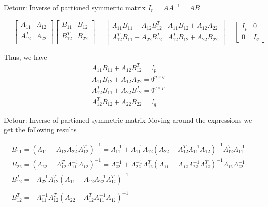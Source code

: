 \documentclass{beamer}
\begin{document}
\begin{frame}{Detour: Inverse of partioned symmetric matrix}
$I_n = AA^{-1} = AB$

$=\begin{bmatrix}
A_{11} & A_{12}\\
A_{12}^T & A_{22} \\
\end{bmatrix} \begin{bmatrix}
B_{11} & B_{12}\\
B_{12}^T & B_{22} \\
\end{bmatrix}
= \begin{bmatrix}
A_{11}B_{11} +A_{12}B_{12}^T & A_{11}B_{12} + A_{12}A_{22}\\
A_{12}^TB_{11} + A_{22}B_{12}^T & A_{12}^TB_{12} + A_{22}B_{22}  \\
\end{bmatrix} = \begin{bmatrix}
I_p & 0 \\
0 & I_q
\end{bmatrix}$

Thus, we have
\begin{gather}
A_{11}B_{11} +A_{12}B_{12}^T = I_p\\
A_{11}B_{12} + A_{12}A_{22} = 0^{p\times q}\\
A_{12}^TB_{11} + A_{22}B_{12}^T = 0^{q\times p}\\
A_{12}^TB_{12} + A_{22}B_{22} = I_q
\end{gather}
\end{frame}

\begin{frame}{Detour: Inverse of partioned symmetric matrix}
Moving around the expressions we get the following results.

\begin{gather}
	B_{11} = (A_{11} - A_{12}A_{22}^{-1}A_{12}^T)^{-1} = A_{11}^{-1} + A_{11}^{-1}A_{12}(A_{22} - A_{12}^TA_{11}^{-1}A_{12})^{-1}A_{12}^TA_{11}^{-1}\\
	B_{22} = (A_{22} - A_{12}^TA_{11}^{-1}A_{12})^{-1} = A_{22}^{-1} + A_{22}^{-1}A_{12}^T(A_{11} - A_{12}A_{22}^{-1}A_{12}^T)^{-1}A_{12}A_{22}^{-1}\\
	B_{12}^T = - A_{22}^{-1}A_{12}^T ( A_{11} - A_{12} A_{22}^{-1} A_{12}^T)^{-1}\\\\
	B_{12}^T = - A_{11}^{-1}A_{12}^T ( A_{22} - A_{12} ^TA_{11}^{-1} A_{12})^{-1}
\end{gather}
\end{frame}
\end{document}
